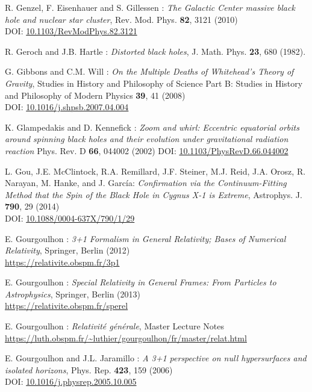 \begin{thebibliography}{123}
R. Genzel, F. Eisenhauer and S. Gillessen :
{\em The Galactic Center massive black hole and nuclear star cluster},
Rev. Mod. Phys. {\bf 82}, 3121 (2010)\\
DOI: \href{https://doi.org/10.1103/RevModPhys.82.3121}{10.1103/RevModPhys.82.3121}

R. Geroch and J.B. Hartle : {\em Distorted black holes},
J. Math. Phys. {\bf 23}, 680 (1982).

G. Gibbons and C.M. Will : {\em On the Multiple Deaths of Whitehead's Theory of Gravity},
Studies in History and Philosophy of Science Part B: Studies in History and Philosophy of Modern Physics {\bf 39}, 41 (2008)\\
DOI: \href{https://doi.org/10.1016/j.shpsb.2007.04.004}{10.1016/j.shpsb.2007.04.004}

K. Glampedakis and D. Kennefick :
{\em Zoom and whirl: Eccentric equatorial orbits around spinning black holes and their evolution under gravitational radiation reaction}
Phys. Rev. D {\bf 66}, 044002 (2002)
DOI: \href{https://doi.org/10.1103/PhysRevD.66.044002}{10.1103/PhysRevD.66.044002}

L. Gou, J.E. McClintock, R.A. Remillard, J.F. Steiner, M.J. Reid, J.A. Orosz, R. Narayan, M. Hanke, and J. García:
{\em Confirmation via the Continuum-Fitting Method that the Spin of the Black Hole in Cygnus X-1 is Extreme},
Astrophys. J. {\bf 790}, 29 (2014)\\
DOI: \href{https://doi.org/10.1088/0004-637X/790/1/29}{10.1088/0004-637X/790/1/29}

E. Gourgoulhon : {\em 3+1 Formalism in General Relativity; Bases of Numerical Relativity},
Springer, Berlin (2012)\\
\url{https://relativite.obspm.fr/3p1}

E. Gourgoulhon : {\em Special Relativity in General Frames: From Particles to Astrophysics},
Springer, Berlin (2013) \\
\url{https://relativite.obspm.fr/sperel}

E. Gourgoulhon : {\em Relativit\'e g\'en\'erale},
Master Lecture Notes\\
\url{https://luth.obspm.fr/~luthier/gourgoulhon/fr/master/relat.html}

E. Gourgoulhon and J.L. Jaramillo : {\em A 3+1 perspective on null hypersurfaces and isolated horizons},
Phys. Rep. {\bf 423}, 159 (2006)\\
DOI: \href{https://doi.org/10.1016/j.physrep.2005.10.005}{10.1016/j.physrep.2005.10.005}


\end{thebibliography}
